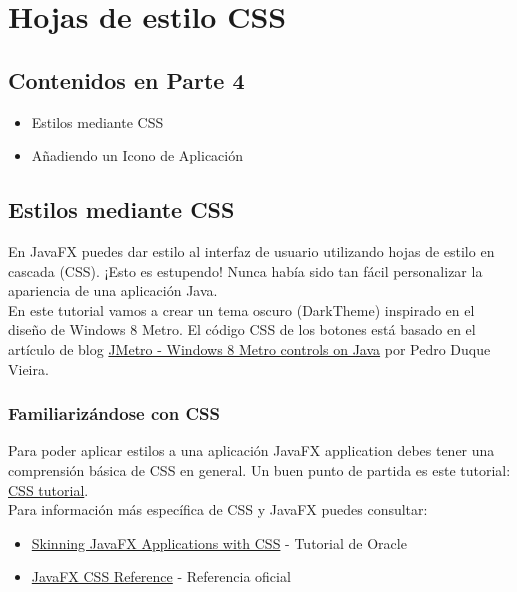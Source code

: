 \chapter{Hojas de estilo CSS}
\section{Contenidos en Parte 4}
\begin{itemize}
    \item Estilos mediante CSS
    \item Añadiendo un Icono de Aplicación
\end{itemize}
\section{Estilos mediante CSS}
En JavaFX puedes dar estilo al interfaz de usuario utilizando hojas de estilo en cascada (CSS). 
¡Esto es estupendo! Nunca había sido tan fácil personalizar la apariencia de una aplicación Java.\\
En este tutorial vamos a crear un tema oscuro (DarkTheme) inspirado en el diseño de Windows 8 Metro. 
El código CSS de los botones está basado en el artículo de blog  
\textcolor{azul}{\href{https://pixelduke.com/2012/10/23/jmetro-windows-8-controls-on-java/}{JMetro - Windows 8 Metro controls on 
Java}} por Pedro Duque Vieira.
\subsection{Familiarizándose con CSS}
Para poder aplicar estilos a una aplicación JavaFX application debes tener una comprensión básica de CSS 
en general. Un buen punto de partida es este tutorial: 
\textcolor{azul}{\href{https://www.csstutorial.net/}{CSS tutorial}}.\\
Para información más específica de CSS y JavaFX puedes consultar:
\begin{itemize}
    \item \textcolor{azul}{\href{https://docs.oracle.com/javase/8/javafx/user-interface-tutorial/css_tutorial.htm}{Skinning JavaFX Applications with CSS}} - Tutorial de Oracle
    \item \textcolor{azul}{\href{https://docs.oracle.com/javase/8/javafx/api/javafx/scene/doc-files/cssref.html}{JavaFX CSS Reference}} - Referencia oficial
\end{itemize}

